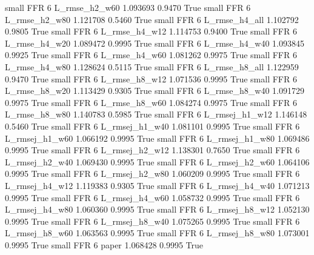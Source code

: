      small      FFR                 6  L_rmse_h2_w60   1.093693      0.9470    True
     small      FFR                 6  L_rmse_h2_w80   1.121708      0.5460    True
     small      FFR                 6  L_rmse_h4_all   1.102792      0.9805    True
     small      FFR                 6  L_rmse_h4_w12   1.114753      0.9400    True
     small      FFR                 6  L_rmse_h4_w20   1.089472      0.9995    True
     small      FFR                 6  L_rmse_h4_w40   1.093845      0.9925    True
     small      FFR                 6  L_rmse_h4_w60   1.081262      0.9975    True
     small      FFR                 6  L_rmse_h4_w80   1.128624      0.5115    True
     small      FFR                 6  L_rmse_h8_all   1.122959      0.9470    True
     small      FFR                 6  L_rmse_h8_w12   1.071536      0.9995    True
     small      FFR                 6  L_rmse_h8_w20   1.113429      0.9305    True
     small      FFR                 6  L_rmse_h8_w40   1.091729      0.9975    True
     small      FFR                 6  L_rmse_h8_w60   1.084274      0.9975    True
     small      FFR                 6  L_rmse_h8_w80   1.140783      0.5985    True
     small      FFR                 6 L_rmsej_h1_w12   1.146148      0.5460    True
     small      FFR                 6 L_rmsej_h1_w40   1.081101      0.9995    True
     small      FFR                 6 L_rmsej_h1_w60   1.066192      0.9995    True
     small      FFR                 6 L_rmsej_h1_w80   1.069486      0.9995    True
     small      FFR                 6 L_rmsej_h2_w12   1.138301      0.7650    True
     small      FFR                 6 L_rmsej_h2_w40   1.069430      0.9995    True
     small      FFR                 6 L_rmsej_h2_w60   1.064106      0.9995    True
     small      FFR                 6 L_rmsej_h2_w80   1.060209      0.9995    True
     small      FFR                 6 L_rmsej_h4_w12   1.119383      0.9305    True
     small      FFR                 6 L_rmsej_h4_w40   1.071213      0.9995    True
     small      FFR                 6 L_rmsej_h4_w60   1.058732      0.9995    True
     small      FFR                 6 L_rmsej_h4_w80   1.060360      0.9995    True
     small      FFR                 6 L_rmsej_h8_w12   1.052130      0.9995    True
     small      FFR                 6 L_rmsej_h8_w40   1.075265      0.9995    True
     small      FFR                 6 L_rmsej_h8_w60   1.063563      0.9995    True
     small      FFR                 6 L_rmsej_h8_w80   1.073001      0.9995    True
     small      FFR                 6          paper   1.068428      0.9995    True
